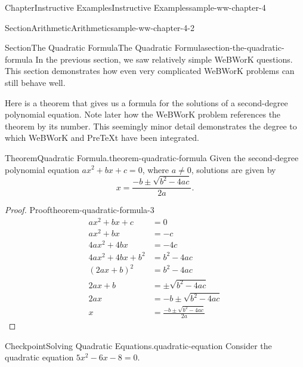 \documentclass[oneside,10pt,]{book}
\newcommand{\blocktitlefont}{\relax}
\newcommand{\mono}[1]{\texttt{#1}}
\newlength{\fillinmaxwidth}
\newlength{\fillincontract}
\newlength{\charmaxwidth}\setlength{\charmaxwidth}{0.5em}
\newlength{\charminwidth}\setlength{\charminwidth}{0.1em}
\newlength{\fillinheight}
\newcommand{\fillintext}[1]{%
\setlength{\fillinmaxwidth}{#1\charmaxwidth}%
\setlength{\fillincontract}{#1\charminwidth}%
\setlength{\fillinheight}{\baselineskip}\addtolength{\fillinheight}{1.2pt}%
\strut\nobreak\leaders\vbox{\hrule width 0.3pt height 0.3pt \vskip -1.2pt}\hskip 1\fillinmaxwidth minus \fillincontract\nobreak\strut%
}
\numberwithin{equation}{section}
\begin{document}
\begin{chapterptx}{Chapter}{Instructive Examples}{}{Instructive Examples}{}{}{sample-ww-chapter-4}
\begin{sectionptx}{Section}{Arithmetic}{}{Arithmetic}{}{}{sample-ww-chapter-4-2}
%
\end{sectionptx}
%
%
\typeout{************************************************}
\typeout{************************************************}
%
\begin{sectionptx}{Section}{The Quadratic Formula}{}{The Quadratic Formula}{}{}{section-the-quadratic-formula}
In the previous section, we saw relatively simple WeBWorK questions. This section demonstrates how even very complicated WeBWorK problems can still behave well.%
\par
Here is a theorem that gives us a formula for the solutions of a second-degree polynomial equation. Note later how the WeBWorK problem references the theorem by its number. This seemingly minor detail demonstrates the degree to which WeBWorK and PreTeXt have been integrated.%
\begin{theorem}{Theorem}{Quadratic Formula.}{}{theorem-quadratic-formula}%
Given the second-degree polynomial equation \(ax^2 + bx + c = 0\), where \(a\neq0\), solutions are given by%
\begin{equation*}
x = \frac{-b\pm\sqrt{b^2-4ac}}{2a}.
\end{equation*}
%
\end{theorem}
\begin{proof}{Proof}{}{theorem-quadratic-formula-3}
%
\begin{align*}
ax^2 + bx + c &= 0\\
ax^2 + bx &= -c\\
4ax^2 + 4bx &= -4c\\
4ax^2 + 4bx + b^2 &= b^2 - 4ac\\
(2ax + b)^2 &= b^2 - 4ac\\
2ax + b &=\pm\sqrt{b^2 - 4ac}\\
2ax &=-b\pm\sqrt{b^2 - 4ac}\\
x &=\frac{-b\pm\sqrt{b^2 - 4ac}}{2a}
\end{align*}
%
\end{proof}
\begin{inlineexercise}{Checkpoint}{Solving Quadratic Equations.}{quadratic-equation}%
Consider the quadratic equation \({5x^{2}-6x-8} = 0\text{.}\)%

\end{inlineexercise}
\end{sectionptx}
\end{chapterptx}
\end{document}
